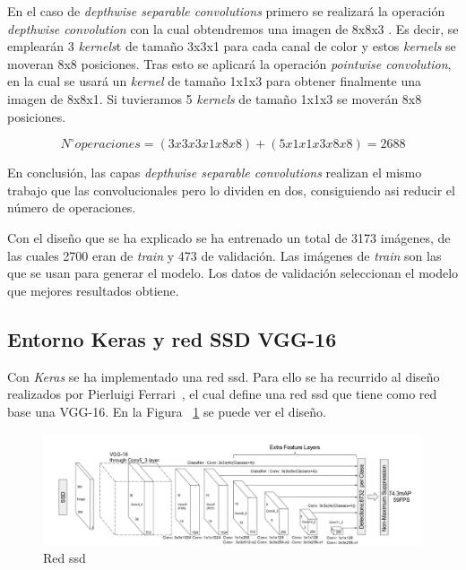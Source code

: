 En el caso de \textit{depthwise separable convolutions} primero se realizará la operación \textit{depthwise convolution} con la cual obtendremos una imagen de 8x8x3 . Es decir, se emplearán 3 \textit{kernels}t de tamaño 3x3x1 para cada canal de color y estos \textit{kernels} se moveran 8x8 posiciones. Tras esto se aplicará la operación \textit{pointwise convolution}, en la cual se usará un \textit{kernel} de tamaño 1x1x3 para obtener finalmente una imagen de 8x8x1. Si tuvieramos 5 \textit{kernels} de tamaño 1x1x3 se moverán 8x8 posiciones.

\begin{equation}\label{mobilenet_formula}
N^{\circ} operaciones = (3x3x3x1x8x8) + (5x1x1x3x8x8) = 2688
\end{equation}

En conclusión, las capas \textit{depthwise separable convolutions} realizan el mismo trabajo que las convolucionales pero lo dividen en dos, consiguiendo asi reducir el número de operaciones.

Con el diseño que se ha explicado se ha entrenado un total de 3173 imágenes, de las cuales 2700 eran de \textit{train} y 473 de validación. Las imágenes de \textit{train} son las que se usan para generar el modelo. Los datos de validación seleccionan el modelo que mejores resultados obtiene.

 \subsection{Entorno Keras y red SSD VGG-16}
 
 Con \textit{Keras} se ha implementado una red \acrshort{ssd}. Para ello se ha recurrido al diseño realizados por Pierluigi Ferrari~\cite{ssd_ferrari}, el cual define una red \acrshort{ssd} que tiene como red base una VGG-16. En la Figura ~\ref{fig.ssd_300} se puede ver el diseño.
 
 \begin{figure}[H] 
\begin{center}
	\includegraphics[width=1.1\textwidth]{figures/Diseno_global/ssd300.png}
   \caption{Red \acrshort{ssd}}
	\label{fig.ssd_300}
\end{center}
\end{figure}

